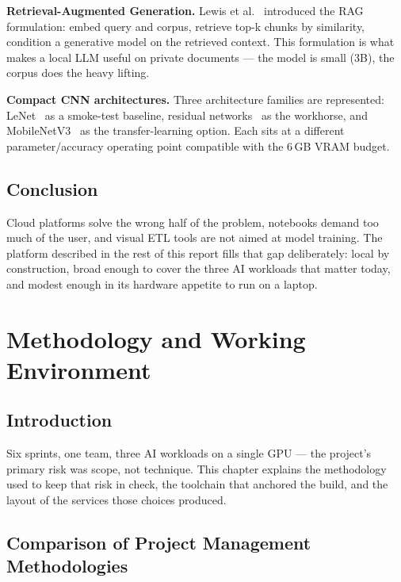 \documentclass[12pt, a4paper, oneside]{report}
\begin{document}
\textbf{Retrieval-Augmented Generation.} Lewis et al.~\cite{rag}
introduced the RAG formulation: embed query and corpus, retrieve top-k
chunks by similarity, condition a generative model on the retrieved
context. This formulation is what makes a local LLM useful on private
documents --- the model is small (3B), the corpus does the heavy
lifting.

\textbf{Compact CNN architectures.} Three architecture families are
represented: LeNet~\cite{lenet} as a smoke-test baseline, residual
networks~\cite{resnet} as the workhorse, and
MobileNetV3~\cite{mobilenetv3} as the transfer-learning option. Each
sits at a different parameter/accuracy operating point compatible with
the 6\,GB VRAM budget.

\section*{Conclusion}

Cloud platforms solve the wrong half of the problem, notebooks demand
too much of the user, and visual ETL tools are not aimed at model
training. The platform described in the rest of this report fills
that gap deliberately: local by construction, broad enough to cover
the three AI workloads that matter today, and modest enough in its
hardware appetite to run on a laptop.

\chapter{Methodology and Working Environment}

\section*{Introduction}

Six sprints, one team, three AI workloads on a single GPU --- the
project's primary risk was scope, not technique. This chapter
explains the methodology used to keep that risk in check, the
toolchain that anchored the build, and the layout of the services
those choices produced.

\section{Comparison of Project Management Methodologies}
\end{document}
